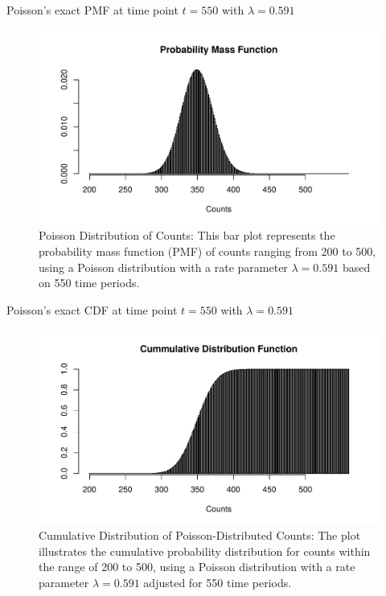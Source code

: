 \documentclass[english]{beamer}\usepackage[]{graphicx}\usepackage[]{xcolor}
\makeatletter
\def\maxwidth{ %
  \ifdim\Gin@nat@width>\linewidth
    \linewidth
  \else
    \Gin@nat@width
  \fi
}
\newenvironment{knitrout}{}{} %
\makeatother
\begin{document}
\begin{frame}{Poisson's exact PMF at time point $t=550$ with $\lambda = 0.591$}
\begin{figure}
\begin{knitrout}
\color{fgcolor}
\includegraphics[width=\maxwidth]{figures/figunnamed-chunk-6-1} 
\end{knitrout}
  \caption{Poisson Distribution of Counts: This bar plot represents the probability mass function (PMF) of counts ranging from 200 to 500, using a Poisson distribution with a rate parameter $\lambda = 0.591$ based on 550 time periods.}
  \label{fig:2_3}
\end{figure}
\end{frame}

\begin{frame}{Poisson's exact CDF at time point $t=550$ with $\lambda = 0.591$}

\begin{figure}
\begin{knitrout}
\color{fgcolor}
\includegraphics[width=\maxwidth]{figures/figunnamed-chunk-7-1} 
\end{knitrout}
  \caption{Cumulative Distribution of Poisson-Distributed Counts: The plot illustrates the cumulative probability distribution for counts within the range of 200 to 500, using a Poisson distribution with a rate parameter $\lambda = 0.591$ adjusted for 550 time periods.}
  \label{fig:2_4}
\end{figure}
\end{frame}
\end{document}
